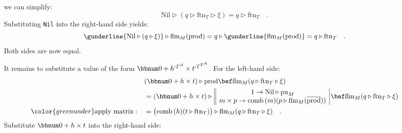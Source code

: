 we can simplify:
\[
\text{Nil}\triangleright(q\triangleright\text{ftn}_{T}\triangleright\xi)=q\triangleright\text{ftn}_{T}\quad.
\]
Substituting \lstinline!Nil! into the right-hand side yields:
\[
\gunderline{\text{Nil}\triangleright(q\triangleright\xi)}\triangleright\text{flm}_{M}(\text{prod})=q\triangleright\gunderline{\text{flm}_{M}(\text{prod})}=q\triangleright\text{ftn}_{T}\quad.
\]
Both sides are now equal.

It remains to substitute a value of the form $\bbnum 0+h^{:T^{A}}\times t^{:T^{T^{A}}}$.
For the left-hand side:
\begin{align*}
 & (\bbnum 0+h\times t)\triangleright\text{prod}\bef\text{flm}_{M}(q\triangleright\text{ftn}_{T}\triangleright\xi)\\
 & =(\bbnum 0+h\times t)\triangleright\,\begin{array}{||c|}
1\rightarrow\text{Nil}\triangleright\text{pu}_{M}\\
m\times p\rightarrow\text{comb}\,(m)(p\triangleright\text{flm}_{M}(\overline{\text{prod}}))
\end{array}\,\bef\text{flm}_{M}(q\triangleright\text{ftn}_{T}\triangleright\xi)\\
{\color{greenunder}\text{apply matrix}:}\quad & =\big(\text{comb}\,(h)(t\triangleright\text{ftn}_{T})\big)\triangleright\text{flm}_{M}(q\triangleright\text{ftn}_{T}\triangleright\xi)\quad.
\end{align*}
Substitute $\bbnum 0+h\times t$ into the right-hand side:
